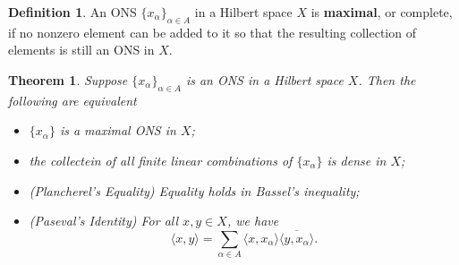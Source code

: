 \documentclass[11pt]{amsart}
\newtheorem*{theorem*}{Theorem}
\theoremstyle{definition}
\newtheorem*{definition*}{Definition}
\renewcommand\:{\colon}
\renewcommand\bar[1]{\overline{#1}}
\begin{document}
\begin{definition*}
	An ONS $\{x_\alpha\}_{\alpha \in A}$ in a Hilbert space $X$ is \textbf{maximal}, or complete, if no nonzero element can be added to it so that the resulting collection of elements is still an ONS in $X$.
\end{definition*}

\begin{theorem*}
	Suppose $\{x_\alpha\}_{\alpha \in A}$ is an ONS in a Hilbert space $X$. Then the following are equivalent
	\begin{itemize}[leftmargin=32.5pt]\setlength\itemsep{0em}
		\item[\textnormal{(i)}] $\{x_\alpha\}$ is a maximal ONS in $X$;
		\item[\textnormal{(ii)}] the collectein of all finite linear combinations of $\{x_\alpha\}$ is dense in $X$;
		\item[\textnormal{(iii)}] \textnormal{(Plancherel's Equality)} Equality holds in Bassel's inequality;
		\item[\textnormal{(iv)}] \textnormal{(Paseval's Identity)} For all $x, y \in X$, we have
			\[ \langle x,y \rangle = \sum_{\alpha \in A} \langle x, x_\alpha \rangle \bar{\langle y, x_\alpha \rangle}. \]
	\end{itemize}
\end{theorem*}
















\clearpage
\end{document}
